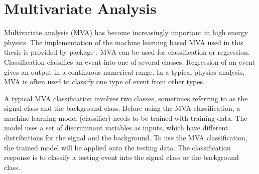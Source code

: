 \section{Multivariate Analysis}
\label{sec:pandoraMVA}

Multivariate analysis (MVA) has become increasingly important in high energy physics. The implementation of the machine learning based MVA used in this thesis is provided by  \TMVA package \cite{Hocker:2007ht}.
MVA can be used for classification or regression. Classification classifies an event into one of several classes. Regression of an event  gives an output in a continuous numerical range. In a typical physics analysis, MVA is often used to classify one type of event from other types.



A typical MVA classification involves two classes, sometimes referring to as the signal class and the background class. Before using the MVA classification, a machine learning model (classifier) needs to be trained with training data. The model uses a set of discriminant variables as inputs, which have different distributions for the signal and the background. To use the MVA classification, the trained model will be applied onto the testing data. The classification response is to classify a testing event into the signal class or the background class.

